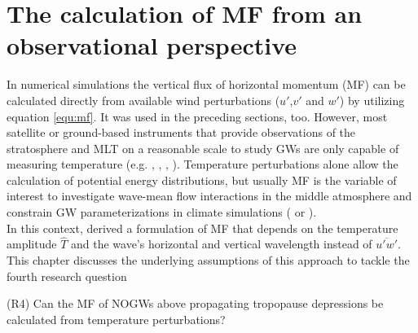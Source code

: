 \chapter{The calculation of MF from an observational perspective}
\label{sec:mf_comp}
In numerical simulations the vertical flux of horizontal momentum (MF) can be calculated directly from available wind perturbations ($u'$,$v'$ and $w'$) by utilizing equation \ref{equ:mf}. It was used in the preceding sections, too. However, most satellite or ground-based instruments that provide observations of the stratosphere and MLT on a reasonable scale to study GWs are only capable of measuring temperature (e.g. \cite{wu_satellite_1996}, \cite[]{ern_absolute_2004}, \cite{hindley_gravity_2019}, \cite{kaifler_compact_2021}). Temperature perturbations alone allow the calculation of potential energy distributions, but usually MF is the variable of interest to investigate wave-mean flow interactions in the middle atmosphere and constrain GW parameterizations in climate simulations (\cite[]{geller_comparison_2013} or \cite[]{kim_overview_2003}). \\
In this context, \textcite[]{ern_absolute_2004} derived a formulation of MF that depends on the temperature amplitude $\hat{T}$ and the wave's horizontal and vertical wavelength instead of $\overbar{u'w'}$. This chapter discusses the underlying assumptions of this approach to tackle the fourth research question
\begin{tcolorbox}[]
    (R4) Can the MF of NOGWs above propagating tropopause depressions be calculated from temperature perturbations?
\end{tcolorbox}

